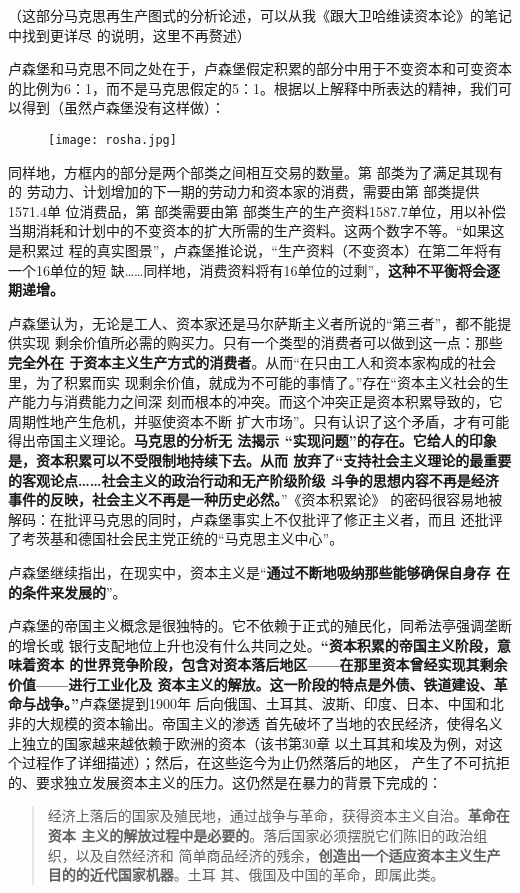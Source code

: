 （这部分马克思再生产图式的分析论述，可以从我《跟大卫哈维读资本论》的笔记中找到更详尽
的说明，这里不再赘述）

卢森堡和马克思不同之处在于，卢森堡假定积累的部分中用于不变资本和可变资本的比例为6：1，而不是马克思假定的5：1。根据以上解释中所表达的精神，我们可以得到（虽然卢森堡没有这样做）：
\begin{figure}
\centering
\texttt{[image: rosha.jpg]}
\label{fig:rosha}
\end{figure}

同样地，方框内的部分是两个部类之间相互交易的数量。第 部类为了满足其现有的
劳动力、计划增加的下一期的劳动力和资本家的消费，需要由第 部类提供1571.4单
位消费品，第 部类需要由第 部类生产的生产资料1587.7单位，用以补偿
当期消耗和计划中的不变资本的扩大所需的生产资料。这两个数字不等。“如果这是积累过
程的真实图景”，卢森堡推论说，“生产资料（不变资本）在第二年将有一个16单位的短
缺……同样地，消费资料将有16单位的过剩”，\textbf{这种不平衡将会逐期递增。}

卢森堡认为，无论是工人、资本家还是马尔萨斯主义者所说的“第三者”，都不能提供实现
剩余价值所必需的购买力。只有一个类型的消费者可以做到这一点：那些\textbf{完全外在
  于资本主义生产方式的消费者}。从而“在只由工人和资本家构成的社会里，为了积累而实
现剩余价值，就成为不可能的事情了。”存在“资本主义社会的生产能力与消费能力之间深
刻而根本的冲突。而这个冲突正是资本积累导致的，它周期性地产生危机，并驱使资本不断
扩大市场”。只有认识了这个矛盾，才有可能得出帝国主义理论。\textbf{马克思的分析无
  法揭示 “实现问题”的存在。它给人的印象是，资本积累可以不受限制地持续下去。从而
  放弃了“支持社会主义理论的最重要的客观论点……社会主义的政治行动和无产阶级阶级
  斗争的思想内容不再是经济事件的反映，社会主义不再是一种历史必然。}”《资本积累论》
的密码很容易地被解码：在批评马克思的同时，卢森堡事实上不仅批评了修正主义者，而且
还批评了考茨基和德国社会民主党正统的“马克思主义中心”。

卢森堡继续指出，在现实中，资本主义是“\textbf{通过不断地吸纳那些能够确保自身存
  在的条件来发展的}”。

卢森堡的帝国主义概念是很独特的。它不依赖于正式的殖民化，同希法亭强调垄断的增长或
银行支配地位上升也没有什么共同之处。\textbf{“资本积累的帝国主义阶段，意味着资本
  的世界竞争阶段，包含对资本落后地区——在那里资本曾经实现其剩余价值——进行工业化及
  资本主义的解放。这一阶段的特点是外债、铁道建设、革命与战争。”}卢森堡提到1900年
后向俄国、土耳其、波斯、印度、日本、中国和北非的大规模的资本输出。帝国主义的渗透
首先破坏了当地的农民经济，使得名义上独立的国家越来越依赖于欧洲的资本（该书第30章
以土耳其和埃及为例，对这个过程作了详细描述）；然后，在这些迄今为止仍然落后的地区，
产生了不可抗拒的、要求独立发展资本主义的压力。这仍然是在暴力的背景下完成的：
\begin{quotation}
  经济上落后的国家及殖民地，通过战争与革命，获得资本主义自治。\textbf{革命在资本
    主义的解放过程中是必要的}。落后国家必须摆脱它们陈旧的政治组织，以及自然经济和
  简单商品经济的残余，\textbf{创造出一个适应资本主义生产目的的近代国家机器}。土耳
  其、俄国及中国的革命，即属此类。
\end{quotation}


